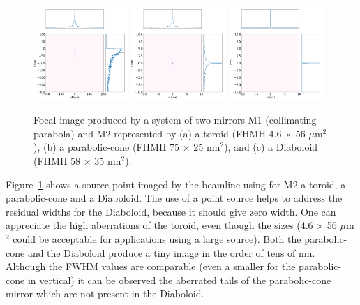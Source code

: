 \documentclass[a4paper, 11pt]{article}
\begin{document}
\begin{figure}[h]
\centering
\includegraphics[width=0.32\textwidth]{figures/bl_point_toroid.png}
\includegraphics[width=0.32\textwidth]{figures/bl_point_parabolic-cone.png}
\includegraphics[width=0.32\textwidth]{figures/bl_point_diaboloid.png}
\caption{\label{fig:bl}Focal image produced by a system of two mirrors M1 (collimating parabola) and M2 represented by (a) a toroid (FHMH 4.6 $\times$ 56 $\mu$m$^2$), (b) a parabolic-cone (FHMH 75 $\times$ 25 nm$^2$), and (c) a Diaboloid (FHMH 58 $\times$ 35 nm$^2$).
}
\end{figure}

Figure~\ref{fig:bl} shows a source point imaged by the beamline using for M2 a toroid, a parabolic-cone and a Diaboloid. The use of a point source helps to address the residual widths for the Diaboloid, because it should give zero width. One can appreciate the high aberrations of the toroid, even though the sizes (4.6 $\times$ 56 $\mu$m$^2$ could be acceptable for applications using a large source). Both the parabolic-cone and the Diaboloid produce a tiny image in the order of tens of nm. Although the FWHM values are comparable (even a smaller for the parabolic-cone in vertical) it can be observed the aberrated tails of the parabolic-cone mirror which are not present in the Diaboloid. 
\end{document}
